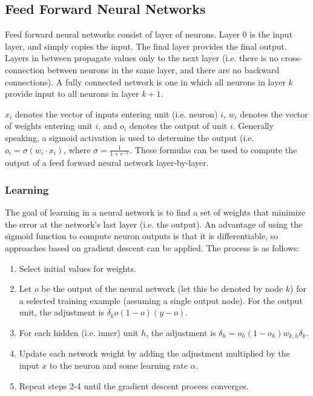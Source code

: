\documentclass[12pt,titlepage]{article}
\begin{document}
    \subsection{Feed Forward Neural Networks}
      Feed forward neural networks consist of layer of neurons. Layer 0 is the input layer, and simply copies the input. The final layer provides the final output.
      Layers in between propagate values only to the next layer (i.e. there is no cross-connection between neurons in the same layer, and there are no backward connections).
      A fully connected network is one in which all neurons in layer $k$ provide input to all neurons in layer $k+1$.

      $x_i$ denotes the vector of inputs entering unit (i.e. neuron) $i$, $w_i$ denotes the vector of weights entering unit $i$, and $o_i$ denotes the output of unit $i$.
      Generally speaking, a sigmoid activation is used to determine the output (i.e. $o_i = \sigma(w_i \cdot x_i)$, where $\sigma = \frac{1}{1 + e^{-x}}$. These formulas
      can be used to compute the output of a feed forward neural network layer-by-layer.

      \subsubsection{Learning}
        The goal of learning in a neural network is to find a set of weights that minimize the error at the network's last layer (i.e. the output). An advantage of using
        the sigmoid function to compute neuron outputs is that it is differentiable, so approaches based on gradient descent can be applied. The process is as follows:

        \begin{enumerate}
          \item Select initial values for weights.
          \item Let $o$ be the output of the neural network (let this be denoted by node $k$) for a selected training example (assuming a single output node). For the output
            unit, the adjustment is $\delta_{k} o(1-o)(y-o)$.
          \item For each hidden (i.e. inner) unit $h$, the adjustment is $\delta_{h} = o_h(1 - o_h)w_{k,h}\delta_{k}$.
          \item Update each network weight by adding the adjustment multiplied by the input $x$ to the neuron and some learning rate $\alpha$.
          \item Repeat steps 2-4 until the gradient descent process converges.
        \end{enumerate}
\end{document}
